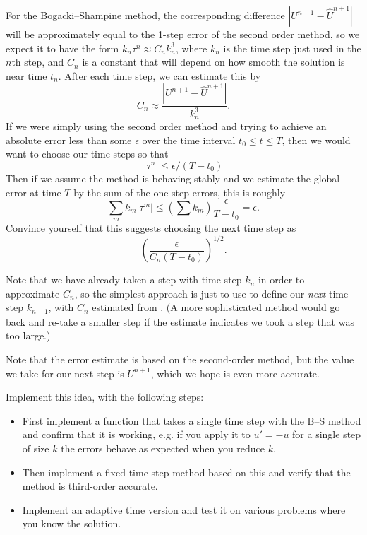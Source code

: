 \documentclass[10pt]{article}
\begin{document}
For the Bogacki--Shampine method, the corresponding difference $|U^{n+1}-\hat
U^{n+1}|$ will be approximately equal to the 1-step error of the second order
method, so we expect it to have the form $k_n\tau^n \approx C_n k_n^3$, where
$k_n$ is the time
step just used in the $n$th step, and $C_n$ is a constant that will depend
on how smooth the solution is near time $t_n$.  After each time step, we
can estimate this by
\begin{equation}\label{Cn}
C_n \approx \frac{|U^{n+1}-\hat U^{n+1}|}{k_n^3}.
\end{equation} 
If we were simply using the second order method and trying to achieve an
absolute error less than some $\epsilon$ over the time interval $t_0 \leq t
\leq T$, then we would want to choose our time steps so that 
\[
|\tau^n| \leq \epsilon / (T-t_0)
\]
Then if we assume the method is behaving stably and we estimate the global
error at time $T$ by the sum of the one-step errors, this is roughly
\[
\sum_m k_m |\tau^m| \leq \left(\sum k_m\right) \frac{\epsilon}{T-t_0} =
\epsilon.
\]
Convince yourself that this suggests choosing the next time step as
\begin{equation}\label{kn}
\left(\frac{\epsilon}{C_n(T-t_0)}\right)^{1/2}.
\end{equation} 

Note that we have already taken a step with time step $k_n$ in order to
approximate $C_n$, so the simplest approach is just to use 
to define our {\em next} time step $k_{n+1}$, with $C_n$ estimated
from .  (A more sophisticated method would go back and
re-take a smaller step if the estimate indicates we took a step
that was too large.)

Note that the error estimate is based on the second-order method, but the
value we take for our next step is $U^{n+1}$, which we hope is even more
accurate.

\newpage
Implement this idea, with the following steps:

\begin{itemize} 
\item First implement a function that takes a single time step with the B--S
method and confirm that it is working, e.g. if you apply it to $u' = -u$
for a single step of size $k$ the errors behave as expected when you reduce
$k$.  

\item Then implement a fixed time step method based on this and verify that
the method is third-order accurate.

\item Implement an adaptive time version and test it on various 
problems where you know the solution.

\end{itemize} 
\end{document}
